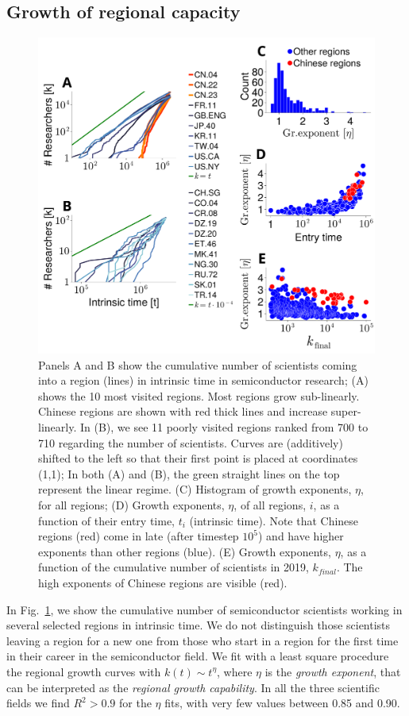\documentclass[draft,final]{vutinfth} %
\begin{document}
\subsection{Growth of regional capacity}
\begin{figure}[!htb]
\centering
\includegraphics[width=0.8\linewidth]{figures_csf/fig3.pdf}
\caption{Panels A and B show the cumulative number of scientists coming into a region (lines) in intrinsic time in semiconductor research; (A) shows the 10 most visited regions. Most regions grow sub-linearly. Chinese regions are shown with red thick lines and increase super-linearly.
In (B), we see 11 poorly visited regions ranked from 700 to 710 regarding the number of scientists. Curves are (additively) shifted to the left so that their first point is placed at coordinates (1,1);
In both (A) and (B), the green straight lines on the top represent the linear regime.
(C) Histogram of growth exponents, $\eta$, for all regions;
(D) Growth exponents, $\eta$, of all regions, $i$, as a function of their entry time, $t_i$ (intrinsic time). Note that Chinese regions (red) come in late (after timestep $10^5$) and have higher exponents than other regions (blue).
(E) Growth exponents, $\eta$, as a function of the cumulative number of scientists in 2019, $k_{final}$. The high exponents of Chinese regions are visible (red).
} 
\label{fig:sc-intrinsic_growth}
\end{figure}
 
In Fig.~\ref{fig:sc-intrinsic_growth}, we show the cumulative number of semiconductor scientists working in several selected regions in intrinsic time. We do not distinguish those scientists leaving a region for a new one from those who start in a region for the first time in their career in the semiconductor field. We fit with a least square procedure the regional growth curves with $k(t) \sim t^{\eta}$, where $\eta$ is the {\em growth exponent}, that can be interpreted as the {\em regional growth capability}.
In all the three scientific fields we find $R^2 > 0.9$ for the $\eta$ fits, with very few values between 0.85 and 0.90.
\end{document}

